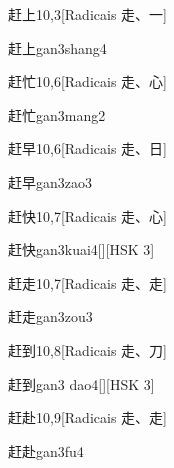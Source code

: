 \begin{entry}{赶上}{10,3}[Radicais ⾛、⼀]
  \begin{phonetics}{赶上}{gan3shang4}
  \end{phonetics}
\end{entry}

\begin{entry}{赶忙}{10,6}[Radicais ⾛、⼼]
  \begin{phonetics}{赶忙}{gan3mang2}
  \end{phonetics}
\end{entry}

\begin{entry}{赶早}{10,6}[Radicais ⾛、⽇]
  \begin{phonetics}{赶早}{gan3zao3}
  \end{phonetics}
\end{entry}

\begin{entry}{赶快}{10,7}[Radicais ⾛、⼼]
  \begin{phonetics}{赶快}{gan3kuai4}[][HSK 3]
  \end{phonetics}
\end{entry}

\begin{entry}{赶走}{10,7}[Radicais ⾛、⾛]
  \begin{phonetics}{赶走}{gan3zou3}
  \end{phonetics}
\end{entry}

\begin{entry}{赶到}{10,8}[Radicais ⾛、⼑]
  \begin{phonetics}{赶到}{gan3 dao4}[][HSK 3]
  \end{phonetics}
\end{entry}

\begin{entry}{赶赴}{10,9}[Radicais ⾛、⾛]
  \begin{phonetics}{赶赴}{gan3fu4}
  \end{phonetics}
\end{entry}

